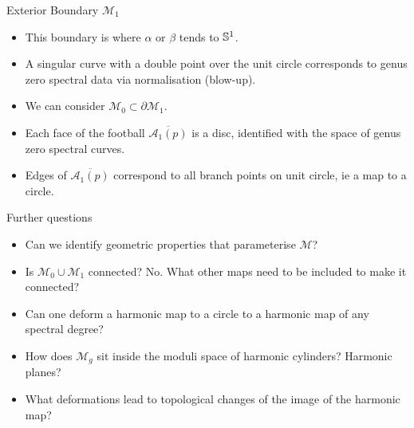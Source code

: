 \documentclass[xcolor=dvipsnames]{beamer}
\begin{document}
\begin{frame}{Exterior Boundary $\mathcal{M}_1$}
\begin{itemize}
\item This boundary is where $α$ or $β$ tends to $\S^1$.
\item A singular curve with a double point over the unit circle corresponds to genus zero spectral data via normalisation (blow-up).
\item We can consider $\mathcal{M}_0 \subset \partial \mathcal{M}_1$.
\item Each face of the football $\overline{\mathcal{A}_1(p)}$ is a disc, identified with the space of genus zero spectral curves. 
\item Edges of $\overline{\mathcal{A}_1(p)}$ correspond to all branch points on unit circle, ie a map to a circle.
\end{itemize}
\end{frame}


\begin{frame}{Further questions}
\begin{itemize}
\item Can we identify geometric properties that parameterise $\mathcal{M}$?
\item Is $\mathcal{M}_0 \cup \mathcal{M}_1$ connected? No.
What other maps need to be included to make it connected? 
\item Can one deform a harmonic map to a circle to a harmonic map of any spectral degree?
\item How does $\mathcal{M}_g$ sit inside the moduli space of harmonic cylinders? Harmonic planes?
\item What deformations lead to topological changes of the image of the harmonic map?
\end{itemize}
\end{frame}
\end{document}
